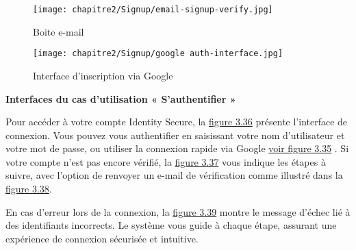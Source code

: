 \begin{figure}[H]
  \centering
  \begin{minipage}[b]{0.9\textwidth}
    \centering
    \texttt{[image: chapitre2/Signup/email-signup-verify.jpg]}
    \caption{Boite e-mail}
    \label{fig:3.34}
  \end{minipage}
\end{figure}

\FloatBarrier
\begin{figure}[H]
  \centering
  \begin{minipage}[b]{0.9\textwidth}
    \centering
    \texttt{[image: chapitre2/Signup/google auth-interface.jpg]}
    \caption{Interface d'inscription via Google}
    \label{fig:3.35}
  \end{minipage}
\end{figure}

\FloatBarrier

\clearpage
\textbf{Interfaces du cas d'utilisation « S'authentifier »}

Pour accéder à votre compte Identity Secure, la \hyperref[fig:3.36]{figure 3.36} présente l'interface de connexion. Vous pouvez vous authentifier en saisissant votre nom d'utilisateur et votre mot de passe, ou utiliser la connexion rapide via Google \hyperref[fig:3.35]{voir figure 3.35} . Si votre compte n'est pas encore vérifié, la \hyperref[fig:3.37]{figure 3.37} vous indique les étapes à suivre, avec l'option de renvoyer un e-mail de vérification comme illustré dans la \hyperref[fig:3.38]{figure 3.38}.

En cas d'erreur lors de la connexion, la \hyperref[fig:3.39]{figure 3.39} montre le message d'échec lié à des identifiants incorrects. Le système vous guide à chaque étape, assurant une expérience de connexion sécurisée et intuitive.

